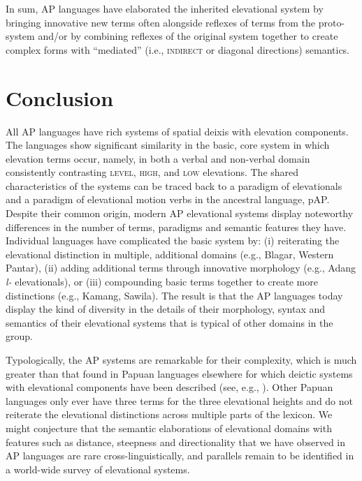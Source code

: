 \newpage
In sum, AP languages have elaborated the inherited elevational system by bringing innovative new terms often alongside reflexes of terms from the proto-system and/or by combining reflexes of the original system together to create complex forms with ``mediated'' (i.e., \textsc{indirect} or diagonal directions) semantics.

\section{Conclusion}\label{sec:7:5}
All AP languages have rich systems of spatial deixis with elevation components. The languages show significant similarity in the basic, core system in which elevation terms occur, namely, in both a verbal and non-verbal domain consistently contrasting \textsc{level,} \textsc{high,} and \textsc{low} elevations. The shared characteristics of the systems can be traced back to a paradigm of elevationals and a paradigm of elevational motion verbs in the ancestral language, pAP. Despite their common origin, modern AP elevational systems display noteworthy differences in the number of terms, paradigms and semantic features they have. Individual languages have complicated the basic system by: (i) reiterating the elevational distinction in multiple, additional domains (e.g., Blagar, Western Pantar), (ii) adding additional terms through innovative morphology (e.g., Adang \textit{l}\textit{{\textepsilon}}\textit{{}-} elevationals), or (iii) compounding basic terms together to create more distinctions (e.g., Kamang, Sawila). The result is that the AP languages today display the kind of diversity in the details of their morphology, syntax and semantics of their elevational systems that is typical of other domains in the group.

\largerpage\relax Typologically, the AP systems are remarkable for their complexity, which is much greater than that found in Papuan languages elsewhere for which deictic systems with elevational components have been described (see, e.g., \citealt{Heeschen1982,Heeschen1987}). Other Papuan languages only ever have three terms for the three elevational heights and do not reiterate the elevational distinctions across multiple parts of the lexicon. We might conjecture that the semantic elaborations of elevational domains with features such as distance, steepness and directionality that we have observed in AP languages are rare cross-linguistically, and parallels remain to be identified in a world-wide survey of elevational systems. 

